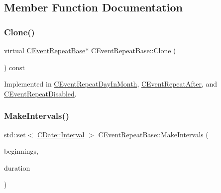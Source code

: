 \subsection{Member Function Documentation}
\mbox{\label{class_c_event_repeat_base_a73b079543ea6d97d38933b6a7544e349}} 
\subsubsection{\texorpdfstring{Clone()}{Clone()}}
{\footnotesize\ttfamily virtual \mbox{\hyperlink{class_c_event_repeat_base}{C\+Event\+Repeat\+Base}}$\ast$ C\+Event\+Repeat\+Base\+::\+Clone (\begin{DoxyParamCaption}{ }\end{DoxyParamCaption}) const\hspace{0.3cm}{\ttfamily [pure virtual]}}



Implemented in \mbox{\hyperlink{class_c_event_repeat_day_in_month_a329373945107435d629ecc2491ce8b38}{C\+Event\+Repeat\+Day\+In\+Month}}, \mbox{\hyperlink{class_c_event_repeat_after_ae635e551a44aeda7b155b7e5243a9872}{C\+Event\+Repeat\+After}}, and \mbox{\hyperlink{class_c_event_repeat_disabled_afc00861b70904d48410ea17db3555da1}{C\+Event\+Repeat\+Disabled}}.

\mbox{\label{class_c_event_repeat_base_ab4f304478f81d70d9670e5e77e61de34}} 
\subsubsection{\texorpdfstring{Make\+Intervals()}{MakeIntervals()}}
{\footnotesize\ttfamily std\+::set$<$ \mbox{\hyperlink{class_c_date_af23472c977b14ed341b48183ec19d874}{C\+Date\+::\+Interval}} $>$ C\+Event\+Repeat\+Base\+::\+Make\+Intervals (\begin{DoxyParamCaption}\item[{const std\+::set$<$ \mbox{\hyperlink{class_c_date}{C\+Date}} $>$ \&}]{beginnings,  }\item[{const \mbox{\hyperlink{class_c_duration}{C\+Duration}} \&}]{duration }\end{DoxyParamCaption})\hspace{0.3cm}{\ttfamily [static]}}

